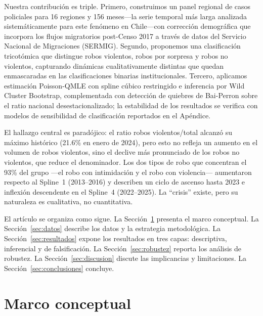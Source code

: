 \documentclass[12pt,a4paper]{article}
\begin{document}
Nuestra contribuci\'on es triple. Primero, construimos un panel regional de casos
policiales para 16 regiones y 156 meses---la serie temporal m\'as larga analizada
sistem\'aticamente para este fen\'omeno en Chile---con correcci\'on demogr\'afica que
incorpora los flujos migratorios post-Censo 2017 a trav\'es de datos del Servicio
Nacional de Migraciones (SERMIG). Segundo, proponemos una clasificaci\'on tricot\'omica
que distingue robos violentos, robos por sorpresa y robos no violentos, capturando
din\'amicas cualitativamente distintas que quedan enmascaradas en las clasificaciones
binarias institucionales. Tercero, aplicamos estimaci\'on Poisson-QMLE con spline c\'ubico restringido e inferencia por Wild Cluster Bootstrap, complementada con detecci\'on de quiebres de Bai-Perron sobre el ratio nacional desestacionalizado; la estabilidad de los resultados se verifica con modelos de sensibilidad de clasificaci\'on reportados en el Ap\'endice.

El hallazgo central es parad\'ojico: el ratio robos violentos/total alcanz\'o su
m\'aximo hist\'orico (21.6\% en enero de 2024), pero esto no refleja un aumento en
el volumen de robos violentos, sino el declive m\'as pronunciado de los robos no
violentos, que reduce el denominador. Los dos tipos de robo que concentran el 93\% del grupo ---el robo con intimidaci\'on y el robo con violencia--- aumentaron respecto al Spline~1 (2013--2016) y describen un ciclo de ascenso hasta 2023 e inflexi\'on descendente en el Spline~4 (2022--2025). La ``crisis'' existe, pero su naturaleza es cualitativa, no cuantitativa.

El art\'iculo se organiza como sigue. La Secci\'on~\ref{sec:marco} presenta el marco
conceptual. La Secci\'on~\ref{sec:datos} describe los datos y la estrategia
metodol\'ogica. La Secci\'on~\ref{sec:resultados} expone los resultados en tres capas:
descriptiva, inferencial y de falsificaci\'on. La Secci\'on~\ref{sec:robustez} reporta
los an\'alisis de robustez. La Secci\'on~\ref{sec:discusion} discute las implicancias
y limitaciones. La Secci\'on~\ref{sec:conclusiones} concluye.


\section{Marco conceptual}
\label{sec:marco}
\end{document}
